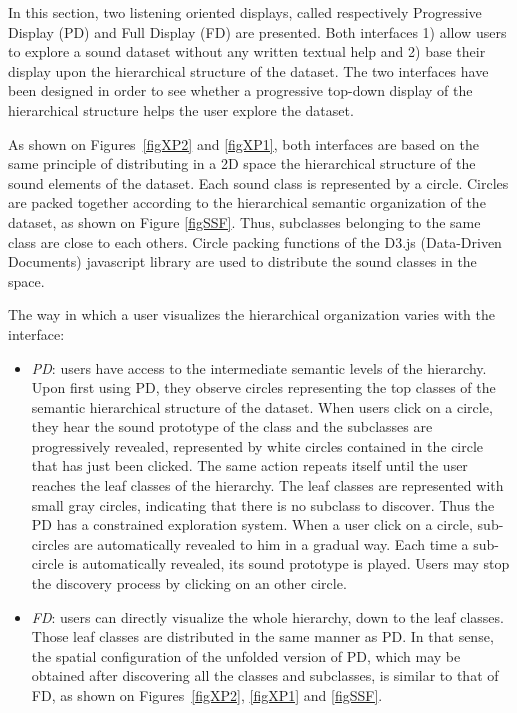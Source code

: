 \documentclass{aes2e}
\begin{document}
In this section, two listening oriented displays, called respectively Progressive Display (PD) and Full Display (FD) are presented. Both interfaces 1) allow users to explore a sound dataset without any written textual help and 2) base their display upon the hierarchical structure of the dataset. The two interfaces have been designed in order to see whether a progressive top-down display of the hierarchical structure helps the user explore the dataset.

As shown on Figures~\ref{figXP2} and \ref{figXP1}, both interfaces are based on the same principle of distributing in a 2D space the hierarchical structure of the  sound elements of the dataset. Each sound class is represented by a circle. Circles are packed together according to the hierarchical semantic organization of the dataset, as shown on Figure \ref{figSSF}. Thus, subclasses belonging to the same class are close to each others. Circle packing functions of the D3.js (Data-Driven Documents) javascript library \cite{2011-d3} are used to distribute the sound classes in the space. 

The way in which a user visualizes the hierarchical organization varies with the interface:

\begin{itemize}
\item \textit{PD}: users have access to the intermediate semantic levels of the hierarchy. Upon first using PD, they observe circles representing the top classes of the semantic hierarchical structure of the dataset. When users click on a circle, they hear the sound prototype of the class and the subclasses are progressively revealed, represented by white circles contained in the circle that has just been clicked. The same action repeats itself until the user reaches the leaf classes of the hierarchy. The leaf classes are represented with small gray circles, indicating that there is no subclass to discover. Thus the PD has a constrained exploration system. When a user click on a circle, sub-circles are  automatically revealed to him in a gradual way. Each time a sub-circle is automatically revealed, its sound prototype is played. Users may stop the discovery process by clicking on an other circle. 
\item \textit{FD}: users can directly visualize the whole hierarchy, down to the leaf classes. Those leaf classes are distributed  in the same manner as PD. In that sense, the spatial configuration of the unfolded version of PD, which may be obtained after discovering all the classes and subclasses, is similar to that of  FD, as shown on Figures~\ref{figXP2}, \ref{figXP1} and \ref{figSSF}.
\end{itemize}
\end{document}
